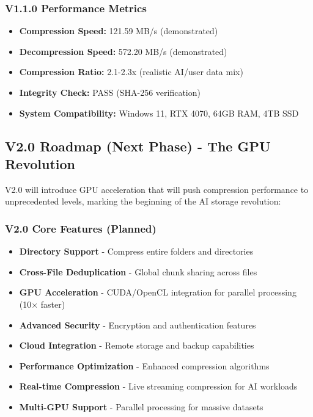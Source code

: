 \documentclass[11pt,a4paper]{article}
\begin{document}
	\subsubsection{V1.1.0 Performance Metrics}
	\begin{itemize}
		\item \textbf{Compression Speed:} 121.59 MB/s (demonstrated)
		\item \textbf{Decompression Speed:} 572.20 MB/s (demonstrated)
		\item \textbf{Compression Ratio:} 2.1-2.3x (realistic AI/user data mix)
		\item \textbf{Integrity Check:} PASS (SHA-256 verification)
		\item \textbf{System Compatibility:} Windows 11, RTX 4070, 64GB RAM, 4TB SSD
	\end{itemize}

	\subsection{V2.0 Roadmap (Next Phase) - The GPU Revolution}

	V2.0 will introduce GPU acceleration that will push compression performance to unprecedented levels, marking the beginning of the AI storage revolution:

	\subsubsection{V2.0 Core Features (Planned)}
	\begin{itemize}
		\item \textbf{Directory Support} - Compress entire folders and directories
		\item \textbf{Cross-File Deduplication} - Global chunk sharing across files
		\item \textbf{GPU Acceleration} - CUDA/OpenCL integration for parallel processing (10× faster)
		\item \textbf{Advanced Security} - Encryption and authentication features
		\item \textbf{Cloud Integration} - Remote storage and backup capabilities
		\item \textbf{Performance Optimization} - Enhanced compression algorithms
		\item \textbf{Real-time Compression} - Live streaming compression for AI workloads
		\item \textbf{Multi-GPU Support} - Parallel processing for massive datasets
	\end{itemize}
\end{document}
